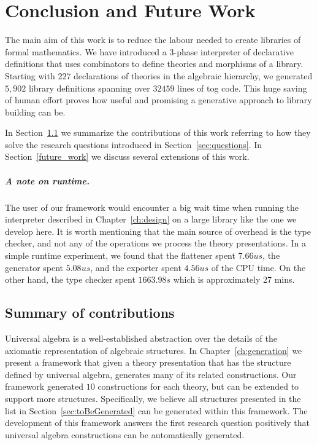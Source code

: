 \chapter{Conclusion and Future Work}
\label{ch:conclusion}

The main aim of this work is to reduce the labour needed to create libraries of formal mathematics. We have introduced a $3$-phase interpreter of declarative definitions that uses combinators to define theories and morphisms of a library. Starting with $227$ declarations of theories in the algebraic hierarchy, we generated $5,902$ library definitions spanning over $32459$ lines of tog code. 
This huge saving of human effort proves how useful and promising a generative approach to library building can be.  

In Section~\ref{conc:summary} we summarize the contributions of this work referring to how they solve the research questions introduced in Section~\ref{sec:questions}. In Section~\ref{future_work} we discuss several extensions of this work. 

\paragraph{A note on runtime.} The user of our framework would encounter a big wait time when running the interpreter described in Chapter~\ref{ch:design} on a large library like the one we develop here. It is worth mentioning that the main source of overhead is the type checker, and not any of the operations we process the theory presentations. In a simple runtime experiment, we found that the flattener spent $7.66 us$, the generator spent $5.08 us$, and the exporter spent $4.56 us$ of the CPU time. On the other hand, the type checker spent $1663.98s $ which is approximately 27 mins.


\section{Summary of contributions}
\label{conc:summary}
Universal algebra is a well-established abstraction over the details of the axiomatic representation of algebraic structures. In Chapter~\ref{ch:generation} we present a framework that given a theory presentation that has the structure defined by universal algebra, generates many of its related constructions. Our framework generated $10$ constructions for each theory, but can be extended to support more structures. Specifically, we believe all structures presented in the list in Section~\ref{sec:toBeGenerated} can be generated within this framework. The development of this framework answers the first research question positively that universal algebra constructions can be automatically generated. 

